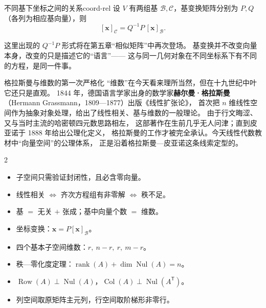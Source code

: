 \documentclass[11pt,a4paper,openany]{ctexbook}
\DeclareMathOperator{\rank}{rank}
\DeclareMathOperator{\Col}{Col}
\DeclareMathOperator{\Nul}{Nul}
\DeclareMathOperator{\Row}{Row}
\begin{document}
\begin{prop}{不同基下坐标之间的关系}{coord-rel}
设 $V$ 有两组基 $\mathcal{B},\mathcal{C}$，基变换矩阵分别为 $P,Q$
（各列为相应基向量），则
\[
[\boldsymbol{x}]_{\mathcal{C}}=Q^{-1}P\,[\boldsymbol{x}]_{\mathcal{B}}.
\]
\end{prop}

这里出现的 $Q^{-1}P$ 形式将在第五章“相似矩阵”中再次登场。
基变换并不改变向量本身，改变的只是描述它的“语言”——
这与同一几何对象在不同坐标系下有不同的方程，是同一件事。

\begin{sidebar}{格拉斯曼与维数的第一次严格化}
“维数”在今天看来理所当然，但在十九世纪中叶它还只是直观。
1844 年，德国语言学家出身的数学家\textbf{赫尔曼·格拉斯曼}
（Hermann Grassmann，1809—1877）出版《线性扩张论》，
首次把 $n$ 维线性空间作为抽象对象处理，给出了线性相关、基与维数的一般理论。
由于行文晦涩、又与当时主流的哈密顿四元数思路相左，
这部著作在生前几乎无人问津；直到皮亚诺于 1888 年给出公理化定义，
格拉斯曼的工作才被完全承认。今天线性代数教材中“向量空间”的公理体系，
正是沿着格拉斯曼—皮亚诺这条线索定型的。
\end{sidebar}

\begin{chapkeys}
\small
\begin{multicols}{2}
\begin{itemize}[leftmargin=1.5em, itemsep=2pt]
\item 子空间只需验证封闭性，且必含零向量。
\item 线性相关 $\Leftrightarrow$ 齐次方程组有非零解 $\Leftrightarrow$ 秩不足。
\item 基 $=$ 无关 $+$ 张成；基中向量个数 $=$ 维数。
\item 坐标变换：$\boldsymbol{x}=P[\boldsymbol{x}]_{\mathcal{B}}$。
\item 四个基本子空间维数：$r,\ n-r,\ r,\ m-r$。
\item 秩—零化度定理：$\rank(A)+\dim\Nul(A)=n$。
\item $\Row(A)\perp\Nul(A)$，$\Col(A)\perp\Nul(A^{\mathsf T})$。
\item 列空间取原矩阵主元列，行空间取阶梯形非零行。
\end{itemize}
\end{multicols}
\end{chapkeys}
\end{document}
